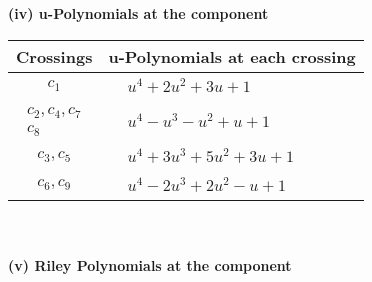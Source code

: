\documentclass[1p]{elsarticle_modified}
\theoremstyle{definition}
\begin{document}
\newpage\renewcommand{\arraystretch}{1}
\flushleft \textbf{(iv) u-Polynomials at the component}\newline \\
\begin{tabular}{m{50pt}|m{274pt}}
Crossings & \hspace{64pt}u-Polynomials at each crossing \\
\hline $$\begin{aligned}c_{1}\end{aligned}$$&$\begin{aligned}
&u^4+2 u^2+3 u+1
\end{aligned}$\\
\hline $$\begin{aligned}c_{2},c_{4},c_{7}\\c_{8}\end{aligned}$$&$\begin{aligned}
&u^4- u^3- u^2+u+1
\end{aligned}$\\
\hline $$\begin{aligned}c_{3},c_{5}\end{aligned}$$&$\begin{aligned}
&u^4+3 u^3+5 u^2+3 u+1
\end{aligned}$\\
\hline $$\begin{aligned}c_{6},c_{9}\end{aligned}$$&$\begin{aligned}
&u^4-2 u^3+2 u^2- u+1
\end{aligned}$\\
\hline
\end{tabular}\\~\\
\newpage\renewcommand{\arraystretch}{1}
\flushleft \textbf{(v) Riley Polynomials at the component}\newline \\
\end{document}
